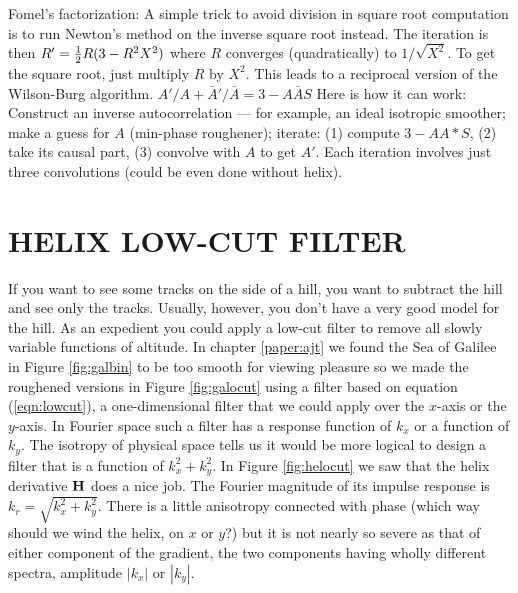 \begin{exer}
\begin{comment}
\item
You hear from three different people
that a more isotropic representation
of the Laplacian is minus one sixth of
$$
\begin{array} {rrr}
-1     & -4 &  -1 \\
-4     & 20 &  -4 \\
-1     & -4 &  -1
\end{array}
$$
What changes need to be made to subroutine \texttt{lapfac()}?
%
\end{comment}
\item
Fomel's factorization:
A simple trick to avoid division in square root computation is to run
Newton's method on the inverse square root instead.
The iteration is then
$R' = {1\over 2} R(3-R^2 X^2)$
where $R$ converges (quadratically) to $1/\sqrt{X^2}$.
To get the square root, just multiply $R$ by $X^2$.
This leads to a reciprocal version of the Wilson-Burg algorithm.
$A'/A + \bar A'/ \bar A = 3 - A \bar A  S $
Here is how it can work:
Construct an inverse autocorrelation ---
for example,
an ideal isotropic smoother;
make a guess for $A$ (min-phase roughener); iterate:
(1) compute $3 - A A* S$,
(2) take its causal part,
(3) convolve with $A$ to get $A'$.
Each iteration involves just three convolutions
(could be even done without helix).
\end{exer}


\section{HELIX LOW-CUT FILTER}
If you want to see some tracks on the side of a hill,
you want to subtract the hill and see only the tracks.
Usually, however, you don't have a very good model for the hill.
As an 
expedient you could apply a low-cut filter to remove all
slowly variable functions of altitude.
In chapter \ref{paper:ajt} we found the Sea of Galilee
in Figure \ref{fig:galbin} to be too smooth for viewing pleasure
so we made the roughened versions
in Figure \ref{fig:galocut}
using a filter based
on equation (\ref{eqn:lowcut}),
a one-dimensional filter that we could apply
over the $x$-axis or the $y$-axis.
In Fourier space such a filter has a response function of $k_x$
or a function of $k_y$.
The isotropy of physical space tells us
it would be more logical to design a filter that
is a function of
$k_x^2+k_y^2$.
In Figure \ref{fig:helocut} we saw that the helix derivative
$\bold H$
does a nice job.
The Fourier magnitude of its impulse response is $k_r=\sqrt{k_x^2+k_y^2}$.
There is a little anisotropy connected with phase (which way should
we wind the helix, on $x$ or $y$?) but it is
not nearly so severe as that of either component of the gradient,
the two components having wholly different spectra,
amplitude $|k_x|$ or $|k_y|$.

